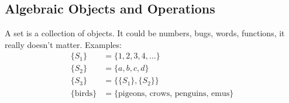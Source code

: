 \subsection{Algebraic Objects and Operations}
	A set is a collection of objects. It could be numbers, bugs, words, functions, it really doesn't matter.
	Examples:
	\begin{align*}
		\{S_1\} &= \{1,2,3,4,\ldots\}
		\\
		\{S_2\} &= \{a,b,c,d\}
		\\
		\{S_3\} &= \{\{S_1\}, \{S_2\}\}
		\\
		\{\text{birds}\} &= \{\text{pigeons},\,\text{crows},\,\text{penguins},\,\text{emus}\}
	\end{align*}
